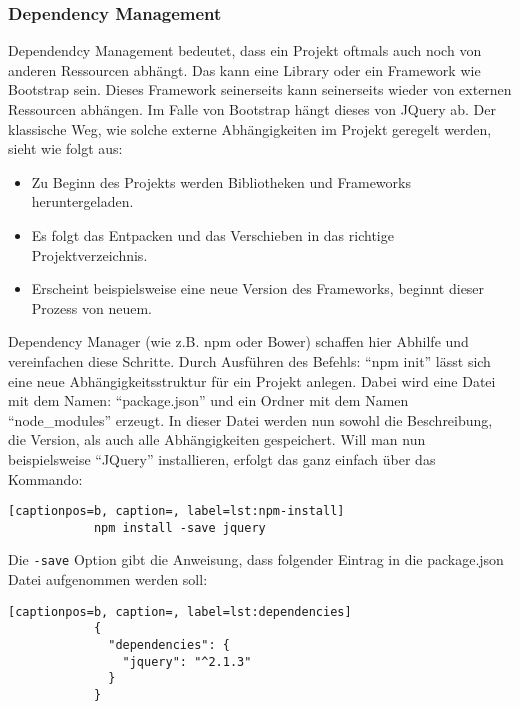 		\subsubsection{Dependency Management} %
		\label{ssub:dependency_management}
			Dependendcy Management bedeutet, dass ein Projekt oftmals auch noch von anderen Ressourcen abhängt. Das kann eine Library oder ein Framework wie Bootstrap sein. Dieses Framework seinerseits kann seinerseits wieder von externen Ressourcen abhängen. Im Falle von Bootstrap hängt dieses von JQuery ab. 
			Der klassische Weg, wie solche externe Abhängigkeiten im Projekt geregelt werden, sieht wie folgt aus:
			\begin{itemize}
				\item Zu Beginn des Projekts werden Bibliotheken und Frameworks heruntergeladen.
				\item Es folgt das Entpacken und das Verschieben in das richtige Projektverzeichnis.
				\item Erscheint beispielsweise eine neue Version des Frameworks, beginnt dieser Prozess von neuem.
			\end{itemize}

			Dependency Manager (wie z.B. npm oder Bower) schaffen hier Abhilfe und vereinfachen diese Schritte. Durch Ausführen des Befehls: "`npm init"' lässt sich eine neue Abhängigkeitsstruktur für ein Projekt anlegen. Dabei wird eine Datei mit dem Namen: "`package.json"' und ein Ordner mit dem Namen "`node\_modules"' erzeugt. In dieser Datei werden nun sowohl die Beschreibung, die Version, als auch alle Abhängigkeiten gespeichert. Will man nun beispielsweise "`JQuery"' installieren, erfolgt das ganz einfach über das Kommando:
			\begin{lstlisting}[captionpos=b, caption=, label=lst:npm-install]
			npm install -save jquery
			\end{lstlisting}
				
			Die \texttt{-save} Option gibt die Anweisung, dass folgender Eintrag in die package.json Datei aufgenommen werden soll:

			\begin{lstlisting}[captionpos=b, caption=, label=lst:dependencies]
			{
			  "dependencies": {
			    "jquery": "^2.1.3"
			  }
			}
			\end{lstlisting}

